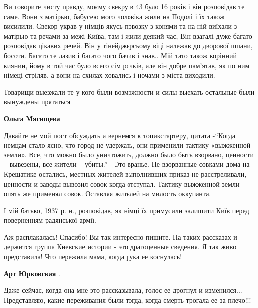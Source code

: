 \begin{itemize}
\begin{itemize}

Ви говорите чисту правду, моєму свекру в 43 було 16 років і він розповідав те
саме. Вони з матірью, бабусею мого чоловіка жили на Подолі і їх також
висилили. Свекор украв у німців якусь повозку з конями та на ній виїхали з
матірью та речами за межі Київа, там і жили деякий час, Він взагалі дуже багато
розповідав цікавих речей. Він у тінейджерсьому віці належав до дворової
шпани, босоти. Багато те лазив і багато чого бачив і знав.. Мій тато також
корінний киянин, йому в той час було всего сім рочків, але він добре пам'ятав, як
по ним німеці стріляв, а вони на схилах ховались і ночами з міста виходили.



Товарищи выезжали те у кого были возможности и силы выехать остальные были
вынуждены прятаться

\begin{itemize} %
\textbf{Ольга Мясищева} 

Давайте не мой пост обсуждать а вернемся к топикстартеру, цитата -\enquote{Когда немцам
стало ясно, что город не удержать, они применили тактику «выжженной земли».
Все, что можно было уничтожить, должно было быть взорвано, ценности – вывезены,
все жители – убиты.} - Это вранье. Не взорванные совками дома на Крещатике
остались, местных жителей выполнивших приказ не расстреливали, ценности и
заводы вывозил совок когда отступал. Тактику выжженной земли опять же применял
совок. Оставляя жителей на милость оккупанта.

\end{itemize} %


І мій батько, 1937 р. н., розповідав, як німці їх примусили залишити Київ перед
поверненням радянської армії.

\end{itemize} %


Аж расплакалась! Спасибо! Вы так интересно пишите. На таких рассказах и держится
группа Киевские истории - это драгоценные сведения. Я так живо представила! Что
пережила мама, когда рука ее коснулась!

\textbf{Арт Юрковская} . 

Даже сейчас, когда она мне это рассказывала, голос ее дрогнул и изменился...
Представляю, какие переживания были тогда, когда смерть трогала ее за плечо!!!



\end{itemize}
